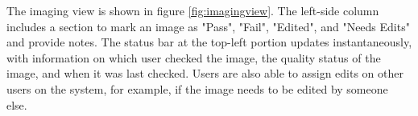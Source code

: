 The imaging view is shown in figure \ref{fig:imagingview}. The left-side column includes a section to mark an image as "Pass", "Fail", "Edited", and "Needs Edits" and provide notes. The status bar at the top-left portion updates instantaneously, with information on which user checked the image, the quality status of the image, and when it was last checked. Users are also able to assign edits on other users on the system, for example, if the image needs to be edited by someone else. 
